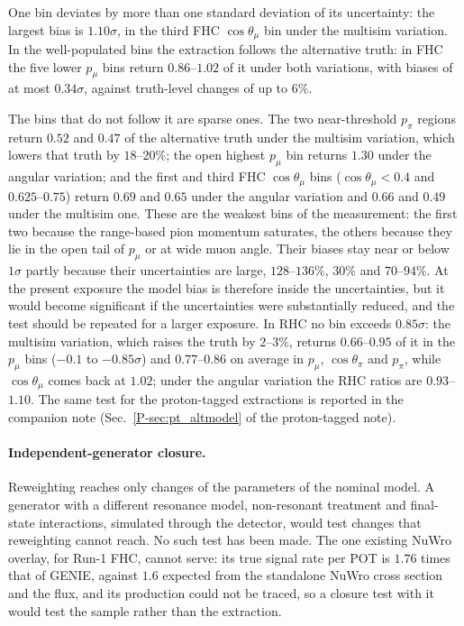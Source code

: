\documentclass[11pt,a4paper]{article}
\newcommand{\ptref}[2]{#1~\ref{P-#2} of the proton-tagged note}
\begin{document}
One bin deviates by more than one standard deviation of its uncertainty: the largest bias is
$1.10\sigma$, in the third FHC $\cos\theta_\mu$ bin under the multisim variation. In the well-populated
bins the extraction follows the alternative truth: in FHC the five lower $p_\mu$ bins return
$0.86$--$1.02$ of it under both variations, with biases of at most $0.34\sigma$, against truth-level
changes of up to $6\%$.

The bins that do not follow it are sparse ones. The two near-threshold $p_\pi$ regions return
$0.52$ and $0.47$ of the alternative truth under the multisim variation, which lowers that truth by
$18$--$20\%$; the open highest $p_\mu$ bin returns $1.30$ under the angular variation; and the first and
third FHC $\cos\theta_\mu$ bins ($\cos\theta_\mu<0.4$ and $0.625$--$0.75$) return $0.69$ and $0.65$
under the angular variation and $0.66$ and $0.49$ under the multisim one. These are the weakest bins
of the measurement: the first two because the range-based pion momentum saturates, the others
because they lie in the open tail of $p_\mu$ or at wide muon angle. Their biases stay near or below
$1\sigma$ partly because their uncertainties are large, $128$--$136\%$, $30\%$ and $70$--$94\%$. At
the present exposure the model bias is therefore inside the uncertainties, but it would become
significant if the uncertainties were substantially reduced, and the test should be repeated for a
larger exposure. In RHC no bin exceeds $0.85\sigma$: the multisim variation, which raises the truth by
$2$--$3\%$, returns $0.66$--$0.95$ of it in the $p_\mu$ bins ($-0.1$ to $-0.85\sigma$) and $0.77$--$0.86$
on average in $p_\mu$, $\cos\theta_\pi$ and $p_\pi$, while $\cos\theta_\mu$ comes back at $1.02$; under
the angular variation the RHC ratios are $0.93$--$1.10$. The same test for the proton-tagged extractions is
reported in the companion note (\ptref{Sec.}{sec:pt_altmodel}).

\paragraph{Independent-generator closure.} Reweighting reaches only changes of the parameters of the
nominal model. A generator with a different resonance model, non-resonant treatment and final-state
interactions, simulated through the detector, would test changes that reweighting cannot reach. No
such test has been made. The one existing NuWro overlay, for Run-1 FHC, cannot serve: its true signal
rate per POT is $1.76$ times that of GENIE, against $1.6$ expected from the standalone NuWro cross
section and the flux, and its production could not be traced, so a closure test with it would test
the sample rather than the extraction.
\end{document}
